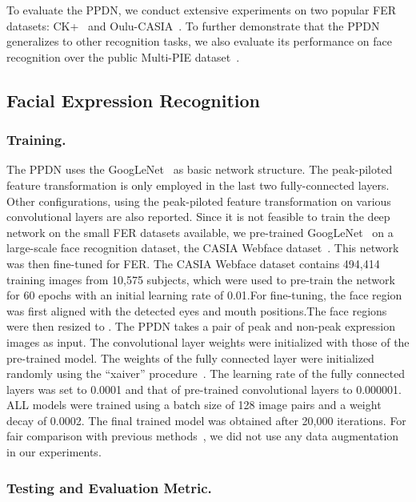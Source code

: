 \documentclass[runningheads]{llncs}
\begin{document}
To evaluate the PPDN, we conduct extensive experiments on two popular 
FER datasets: CK+~\cite{lucey2010extended} and 
Oulu-CASIA~\cite{zhao2011facial}. To further demonstrate that the PPDN
generalizes to other recognition tasks, we also evaluate its performance
on face recognition over the public Multi-PIE 
dataset~\cite{gross2010multi}.

\subsection{Facial Expression Recognition}
\subsubsection{Training.} The PPDN uses the GoogLeNet~\cite{szegedy2015going} 
as basic network structure. The peak-piloted feature transformation is only 
employed in the last two fully-connected layers. Other configurations,
using the peak-piloted feature transformation on various convolutional 
layers are also reported. Since it is not feasible to train the deep network 
on the small FER datasets available, we pre-trained 
GoogLeNet~\cite{szegedy2015going} on a large-scale face recognition dataset,  
the CASIA Webface dataset~\cite{yi2014learning}. This network was then 
fine-tuned for FER. The CASIA Webface dataset contains 494,414 training 
images from 10,575 subjects, which were used to pre-train the network 
for 60 epochs with an initial learning rate of 0.01.For fine-tuning, the face region 
was first aligned with the detected eyes and mouth positions.The face regions 
were then resized to . The PPDN takes a pair of peak and 
non-peak expression images as input. The convolutional layer weights
were initialized with those of the pre-trained model. The weights of the 
fully connected layer were initialized randomly using the 
``xaiver'' procedure~\cite{glorot2010understanding}. The learning rate of 
the fully connected layers was set to 0.0001 and that of pre-trained 
convolutional layers to 0.000001.  ALL models were trained 
using a batch size of 128 image pairs and a weight 
decay of 0.0002. The final trained model was obtained after 20,000 
iterations. For fair comparison with previous 
methods~\cite{zhong2012learning,shan2009facial,liu2014facial}, we did not 
use any data augmentation in our experiments. 


\subsubsection{Testing and Evaluation Metric.}
\end{document}
